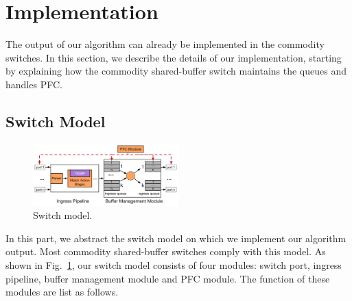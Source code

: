 \section{Implementation}\label{sec:implementation}

The output of our algorithm can already be implemented in the commodity switches. In this section, we
describe the details of our implementation, starting by explaining how the commodity shared-buffer switch
maintains the queues and handles PFC.   

\subsection{Switch Model}\label{subsec:model}

\begin{figure}
	\hspace{-0.2in}
	\centering
		\includegraphics[width=0.5\textwidth] {figs/switch_model}
	\caption{Switch model.}\label{fig:switchmodel}

\end{figure}

In this part, we abstract the switch model on which we implement our algorithm output. 
Most commodity shared-buffer switches comply with this model. 
As shown in Fig.~\ref{fig:switchmodel}, our switch model consists of four modules: switch port, ingress pipeline, buffer management module and PFC module. The function of these modules are list as follows.


